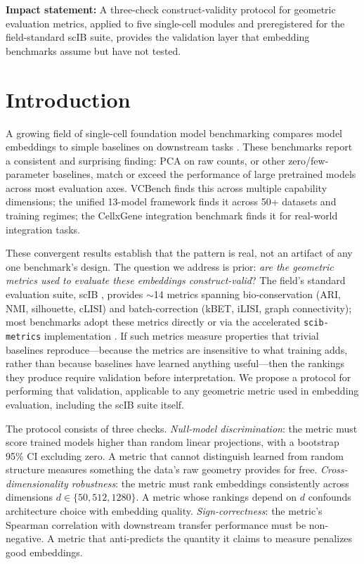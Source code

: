 \documentclass[10pt,letterpaper]{article}
\begin{document}
\noindent\textbf{Impact statement:} A three-check construct-validity protocol for geometric evaluation metrics, applied to five single-cell modules and preregistered for the field-standard scIB suite, provides the validation layer that embedding benchmarks assume but have not tested.


\section{Introduction}

A growing field of single-cell foundation model benchmarking compares model embeddings to simple baselines on downstream tasks \citep{luecken2022scib, wu2025scfm, vcbench2026, unifiedscfm2026, cellxgeneintegration2026}. These benchmarks report a consistent and surprising finding: PCA on raw counts, or other zero/few-parameter baselines, match or exceed the performance of large pretrained models across most evaluation axes. VCBench \citep{vcbench2026} finds this across multiple capability dimensions; the unified 13-model framework \citep{unifiedscfm2026} finds it across 50+ datasets and training regimes; the CellxGene integration benchmark \citep{cellxgeneintegration2026} finds it for real-world integration tasks.

These convergent results establish that the pattern is real, not an artifact of any one benchmark's design. The question we address is prior: \emph{are the geometric metrics used to evaluate these embeddings construct-valid}? The field's standard evaluation suite, scIB \citep{luecken2022scib}, provides $\sim$14 metrics spanning bio-conservation (ARI, NMI, silhouette, cLISI) and batch-correction (kBET, iLISI, graph connectivity); most benchmarks adopt these metrics directly or via the accelerated \texttt{scib-metrics} implementation \citep{scibmetrics2023}. If such metrics measure properties that trivial baselines reproduce---because the metrics are insensitive to what training adds, rather than because baselines have learned anything useful---then the rankings they produce require validation before interpretation. We propose a protocol for performing that validation, applicable to any geometric metric used in embedding evaluation, including the scIB suite itself.

The protocol consists of three checks. \emph{Null-model discrimination}: the metric must score trained models higher than random linear projections, with a bootstrap 95\% CI excluding zero. A metric that cannot distinguish learned from random structure measures something the data's raw geometry provides for free. \emph{Cross-dimensionality robustness}: the metric must rank embeddings consistently across dimensions $d \in \{50, 512, 1280\}$. A metric whose rankings depend on $d$ confounds architecture choice with embedding quality. \emph{Sign-correctness}: the metric's Spearman correlation with downstream transfer performance must be non-negative. A metric that anti-predicts the quantity it claims to measure penalizes good embeddings.
\end{document}
